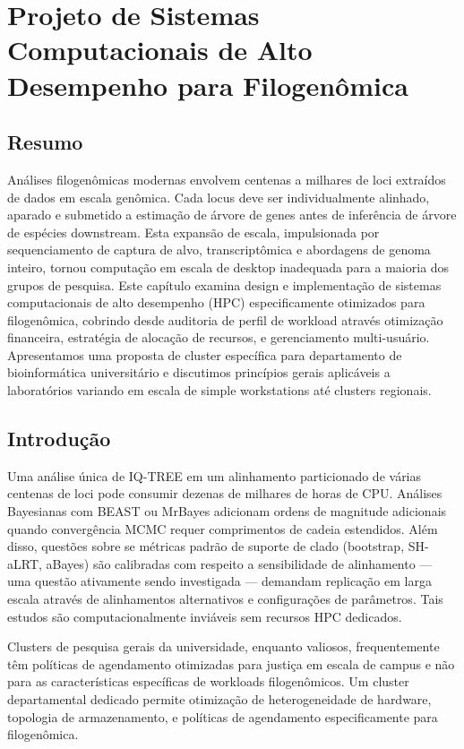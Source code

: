 
\chapter{Projeto de Sistemas Computacionais de Alto Desempenho para Filogenômica}

\section*{Resumo}

Análises filogenômicas modernas envolvem centenas a milhares de loci extraídos de dados em escala genômica. Cada locus deve ser individualmente alinhado, aparado e submetido a estimação de árvore de genes antes de inferência de árvore de espécies downstream. Esta expansão de escala, impulsionada por sequenciamento de captura de alvo, transcriptômica e abordagens de genoma inteiro, tornou computação em escala de desktop inadequada para a maioria dos grupos de pesquisa. Este capítulo examina design e implementação de sistemas computacionais de alto desempenho (HPC) especificamente otimizados para filogenômica, cobrindo desde auditoria de perfil de workload através otimização financeira, estratégia de alocação de recursos, e gerenciamento multi-usuário. Apresentamos uma proposta de cluster específica para departamento de bioinformática universitário e discutimos princípios gerais aplicáveis a laboratórios variando em escala de simple workstations até clusters regionais.

\section{Introdução}

Uma análise única de IQ-TREE em um alinhamento particionado de várias centenas de loci pode consumir dezenas de milhares de horas de CPU. Análises Bayesianas com BEAST ou MrBayes adicionam ordens de magnitude adicionais quando convergência MCMC requer comprimentos de cadeia estendidos. Além disso, questões sobre se métricas padrão de suporte de clado (bootstrap, SH-aLRT, aBayes) são calibradas com respeito a sensibilidade de alinhamento --- uma questão ativamente sendo investigada --- demandam replicação em larga escala através de alinhamentos alternativos e configurações de parâmetros. Tais estudos são computacionalmente inviáveis sem recursos HPC dedicados.

Clusters de pesquisa gerais da universidade, enquanto valiosos, frequentemente têm políticas de agendamento otimizadas para justiça em escala de campus e não para as características específicas de workloads filogenômicos. Um cluster departamental dedicado permite otimização de heterogeneidade de hardware, topologia de armazenamento, e políticas de agendamento especificamente para filogenômica.

